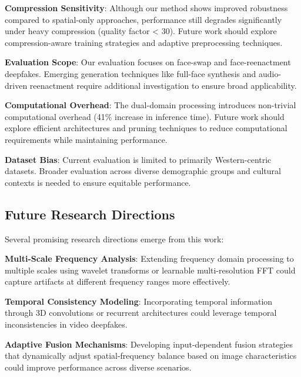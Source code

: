 \documentclass[letterpaper]{article} %
\begin{document}
\textbf{Compression Sensitivity}: Although our method shows improved robustness compared to spatial-only approaches, performance still degrades significantly under heavy compression (quality factor < 30). Future work should explore compression-aware training strategies and adaptive preprocessing techniques.

\textbf{Evaluation Scope}: Our evaluation focuses on face-swap and face-reenactment deepfakes. Emerging generation techniques like full-face synthesis and audio-driven reenactment require additional investigation to ensure broad applicability.

\textbf{Computational Overhead}: The dual-domain processing introduces non-trivial computational overhead (41\% increase in inference time). Future work should explore efficient architectures and pruning techniques to reduce computational requirements while maintaining performance.

\textbf{Dataset Bias}: Current evaluation is limited to primarily Western-centric datasets. Broader evaluation across diverse demographic groups and cultural contexts is needed to ensure equitable performance.

\subsection{Future Research Directions}

Several promising research directions emerge from this work:

\textbf{Multi-Scale Frequency Analysis}: Extending frequency domain processing to multiple scales using wavelet transforms or learnable multi-resolution FFT could capture artifacts at different frequency ranges more effectively.

\textbf{Temporal Consistency Modeling}: Incorporating temporal information through 3D convolutions or recurrent architectures could leverage temporal inconsistencies in video deepfakes.

\textbf{Adaptive Fusion Mechanisms}: Developing input-dependent fusion strategies that dynamically adjust spatial-frequency balance based on image characteristics could improve performance across diverse scenarios.
\end{document}

